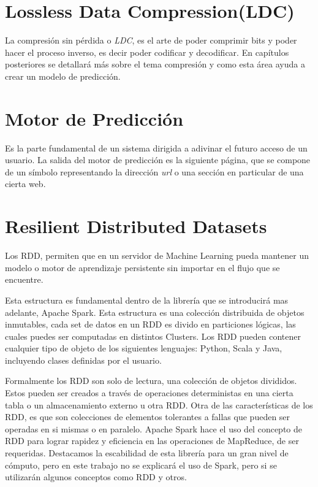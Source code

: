 \section{Lossless Data Compression(LDC)}

La compresión sin pérdida o \emph{LDC}, es el arte de poder comprimir bits y poder hacer el proceso inverso, es decir poder codificar y decodificar. En capítulos posteriores se detallará más sobre el tema compresión y como esta área ayuda a crear un modelo de predicción.





\section{Motor de Predicción}

Es la parte fundamental de un sistema dirigida a adivinar el futuro acceso de un usuario. La salida del motor de predicción es la siguiente página, que se compone de un símbolo representando la dirección \emph{url} o una sección en particular de una cierta web. 

 


\section{Resilient Distributed Datasets }

	Los RDD, permiten que en un servidor de Machine Learning pueda mantener un modelo o motor de aprendizaje persistente sin importar en el flujo que se encuentre.

	Esta estructura es fundamental dentro de la librería que se introducirá mas adelante, Apache Spark. Esta estructura es una colección distribuida de objetos inmutables, cada 
	set de datos en un RDD es divido en particiones lógicas, las cuales puedes ser computadas en distintos Clusters. Los RDD pueden contener cualquier tipo de objeto de los siguientes lenguajes: Python, Scala y Java, incluyendo clases definidas por el usuario. 

	Formalmente los RDD son solo de lectura, una colección de objetos divididos. Estos pueden ser creados a través de  operaciones deterministas en una cierta tabla o un almacenamiento externo u otra RDD.
	Otra de las características de los RDD, es que son colecciones de elementos tolerantes a fallas que pueden ser operadas en si mismas o en paralelo.
	Apache Spark hace el uso del concepto de RDD para lograr rapidez y eficiencia en las operaciones de MapReduce, de ser requeridas. Destacamos la escabilidad de esta librería para un gran nivel de cómputo, pero en este trabajo no se explicará el uso de Spark, pero si se utilizarán algunos conceptos como RDD y otros.




